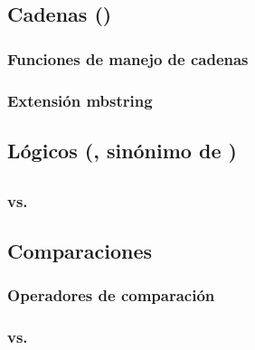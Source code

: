 \documentclass[a4paper,11pt,spanish]{sphinxmanual}
\begin{document}
\subsection{Cadenas ()}
\label{\detokenize{php:cadenas-string}}

\subsubsection{Funciones de manejo de cadenas}
\label{\detokenize{php:funciones-de-manejo-de-cadenas}}

\subsubsection{Extensión mbstring}
\label{\detokenize{php:extension-mbstring}}

\subsection{Lógicos (, sinónimo de )}
\label{\detokenize{php:logicos-bool-sinonimo-de-boolean}}

\subsection{}
\label{\detokenize{php:null}}

\subsubsection{ vs. }
\label{\detokenize{php:is-null-vs-null}}

\subsection{Comparaciones}
\label{\detokenize{php:comparaciones}}

\subsubsection{Operadores de comparación}
\label{\detokenize{php:operadores-de-comparacion}}

\subsubsection{\sphinxstyleliteralintitle{==} vs. \sphinxstyleliteralintitle{===}}
\label{\detokenize{php:vs}}
\end{document}
